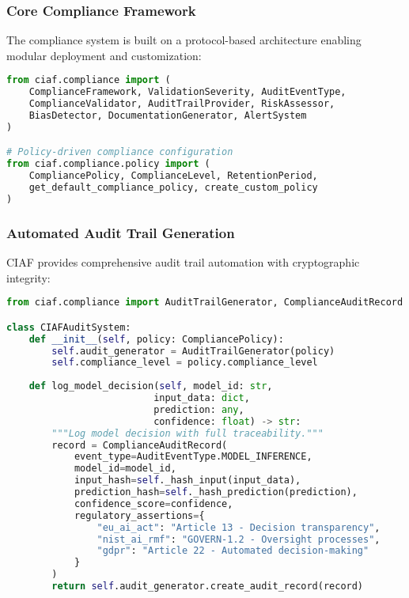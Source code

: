 \documentclass[12pt,a4paper]{article}
\begin{document}
\subsubsection{Core Compliance Framework}

The compliance system is built on a protocol-based architecture enabling modular deployment and customization:

\begin{lstlisting}[language=Python, caption=Core Compliance Interfaces]
from ciaf.compliance import (
    ComplianceFramework, ValidationSeverity, AuditEventType,
    ComplianceValidator, AuditTrailProvider, RiskAssessor,
    BiasDetector, DocumentationGenerator, AlertSystem
)

# Policy-driven compliance configuration
from ciaf.compliance.policy import (
    CompliancePolicy, ComplianceLevel, RetentionPeriod,
    get_default_compliance_policy, create_custom_policy
)
\end{lstlisting}

\subsubsection{Automated Audit Trail Generation}

CIAF provides comprehensive audit trail automation with cryptographic integrity:

\begin{lstlisting}[language=Python, caption=Audit Trail Implementation]
from ciaf.compliance import AuditTrailGenerator, ComplianceAuditRecord

class CIAFAuditSystem:
    def __init__(self, policy: CompliancePolicy):
        self.audit_generator = AuditTrailGenerator(policy)
        self.compliance_level = policy.compliance_level
    
    def log_model_decision(self, model_id: str, 
                          input_data: dict, 
                          prediction: any,
                          confidence: float) -> str:
        """Log model decision with full traceability."""
        record = ComplianceAuditRecord(
            event_type=AuditEventType.MODEL_INFERENCE,
            model_id=model_id,
            input_hash=self._hash_input(input_data),
            prediction_hash=self._hash_prediction(prediction),
            confidence_score=confidence,
            regulatory_assertions={
                "eu_ai_act": "Article 13 - Decision transparency",
                "nist_ai_rmf": "GOVERN-1.2 - Oversight processes",
                "gdpr": "Article 22 - Automated decision-making"
            }
        )
        return self.audit_generator.create_audit_record(record)
\end{lstlisting}
\end{document}
